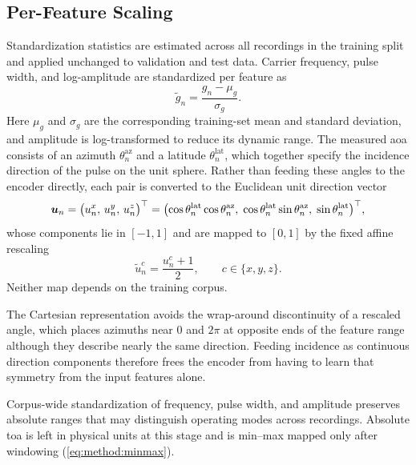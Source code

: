 \subsection{Per-Feature Scaling}\label{sec:method:data:norm}

Standardization statistics are estimated across all recordings in the training split and applied unchanged to validation and test data.
Carrier frequency, pulse width, and log-amplitude are standardized per feature as
\begin{equation}\label{eq:method:standardize}
  \tilde{g}_n = \frac{g_n - \mu_g}{\sigma_g}.
\end{equation}
Here $\mu_g$ and $\sigma_g$ are the corresponding training-set mean and standard deviation, and amplitude is log-transformed to reduce its dynamic range.
The measured \gls{aoa} consists of an azimuth $\theta^{\mathrm{az}}_n$ and a latitude $\theta^{\mathrm{lat}}_n$, which together specify the incidence direction of the pulse on the unit sphere.
Rather than feeding these angles to the encoder directly, each pair is converted to the Euclidean unit direction vector
\begin{equation}\label{eq:method:aoa_cart}
  \bm{u}_n
  =
  \bigl(u^{x}_n,\, u^{y}_n,\, u^{z}_n\bigr)^{\top}
  =
  \bigl(
    \cos\theta^{\mathrm{lat}}_n \cos\theta^{\mathrm{az}}_n,\;
    \cos\theta^{\mathrm{lat}}_n \sin\theta^{\mathrm{az}}_n,\;
    \sin\theta^{\mathrm{lat}}_n
  \bigr)^{\top},
\end{equation}
whose components lie in $[-1,1]$ and are mapped to $[0,1]$ by the fixed affine rescaling
\begin{equation}\label{eq:method:aoa_scale}
  \tilde{u}^{c}_n = \frac{u^{c}_n + 1}{2},
  \qquad
  c \in \{x, y, z\}.
\end{equation}
Neither map depends on the training corpus.

The Cartesian representation avoids the wrap-around discontinuity of a rescaled angle, which places azimuths near $0$ and $2\pi$ at opposite ends of the feature range although they describe nearly the same direction.
Feeding incidence as continuous direction components therefore frees the encoder from having to learn that symmetry from the input features alone.

Corpus-wide standardization of frequency, pulse width, and amplitude preserves absolute ranges that may distinguish operating modes across recordings.
Absolute \gls{toa} is left in physical units at this stage and is min--max mapped only after windowing (\cref{eq:method:minmax}).

